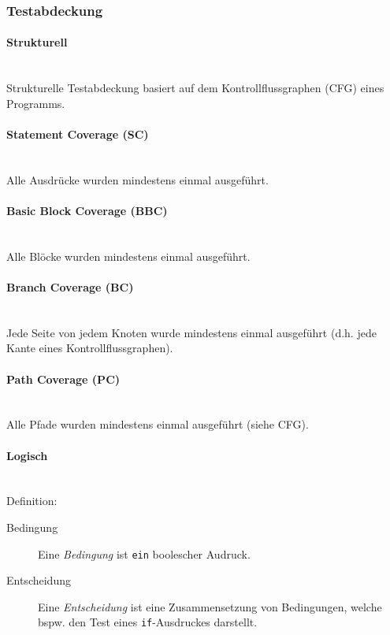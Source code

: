 \documentclass[ngerman]{tuda_summary}
\begin{document}
\subsubsection{Testabdeckung}
\paragraph{Strukturell}\mbox{}\\
Strukturelle Testabdeckung basiert auf dem Kontrollflussgraphen (CFG) eines Programms.

\paragraph{Statement Coverage (SC)}\mbox{}\\
Alle Ausdrücke wurden mindestens einmal ausgeführt.

\paragraph{Basic Block Coverage (BBC)}\mbox{}\\
Alle Blöcke wurden mindestens einmal ausgeführt.

\paragraph{Branch Coverage (BC)}\mbox{}\\
Jede Seite von jedem Knoten wurde mindestens einmal ausgeführt (d.h. jede Kante eines Kontrollflussgraphen).

\paragraph{Path Coverage (PC)}\mbox{}\\
Alle Pfade wurden mindestens einmal ausgeführt (siehe CFG).

\paragraph{Logisch}\mbox{}\\
Definition:
\begin{description}
    \item[Bedingung] Eine \textit{Bedingung} ist \texttt{ein} boolescher Audruck.
    \item[Entscheidung] Eine \textit{Entscheidung} ist eine Zusammensetzung von Bedingungen, welche bspw. den Test eines \texttt{if}-Ausdruckes darstellt.
\end{description}
\end{document}
